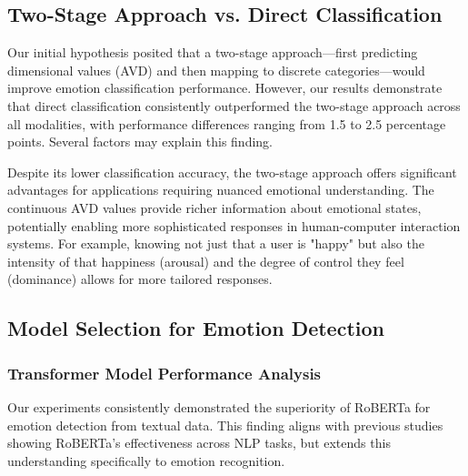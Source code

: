 \documentclass[12pt]{article}
\begin{document}
\subsection{Two-Stage Approach vs. Direct Classification}

Our initial hypothesis posited that a two-stage approach—first predicting dimensional values (AVD) and then mapping to discrete categories—would improve emotion classification performance. However, our results demonstrate that direct classification consistently outperformed the two-stage approach across all modalities, with performance differences ranging from 1.5 to 2.5 percentage points. Several factors may explain this finding.

Despite its lower classification accuracy, the two-stage approach offers significant advantages for applications requiring nuanced emotional understanding. The continuous AVD values provide richer information about emotional states, potentially enabling more sophisticated responses in human-computer interaction systems. For example, knowing not just that a user is "happy" but also the intensity of that happiness (arousal) and the degree of control they feel (dominance) allows for more tailored responses.

\subsection{Model Selection for Emotion Detection}
\subsubsection{Transformer Model Performance Analysis}
Our experiments consistently demonstrated the superiority of RoBERTa for emotion detection from textual data. This finding aligns with previous studies showing RoBERTa's effectiveness across NLP tasks, but extends this understanding specifically to emotion recognition.
\end{document}
